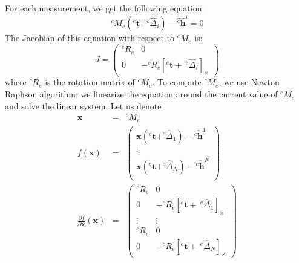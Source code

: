 \documentclass {article}
\newcommand\transf[2]{^{#1}M_{#2}}
\newcommand\linvel{\mathbf{v}}
\newcommand\angvel{\omega}
\newcommand\cross[1]{\left[#1\right]_{\times}}
\newcommand\x{\mathbf{x}}
\newcommand\hole{\mathbf{h}}
\newcommand\tool{\mathbf{t}}
\begin{document}
For each measurement, we get the following equation:
$$
\transf{c}{e}(^e\tool + ^{e}\hat{\Delta}_i) - \hat{^{c}\hole}^i = 0
$$
The Jacobian of this equation with respect to $\transf{c}{e}$ is:
$$
J = \left(\begin{array}{cc} ^{c}R_{e} & 0 \\ 0 & -^{c}R_{e}\cross{^e\tool +\ ^{e}\hat{\Delta}_i}\end{array}\right)
$$
where $^{c}R_{e}$ is the rotation matrix of $\transf{c}{e}$.
To compute $\transf{c}{e}$, we use Newton Raphson algorithm: we linearize the
equation around the current value of $\transf{c}{e}$ and solve the linear
system. Let us denote
\begin{eqnarray*}
  \x &=& \transf{c}{e} \\
  f(\x) &=& \left(\begin{array}{c}
    \x(^e\tool + ^{e}\hat{\Delta}_1) - \hat{^{c}\hole}^1\\
    \vdots\\
    \x(^e\tool + ^{e}\hat{\Delta}_N) - \hat{^{c}\hole}^N\\
    \end{array}\right) \\
    \frac{\partial f}{\partial \x}(\x) &=&
    \left(\begin{array}{cc}
      ^{c}R_{e} & 0 \\
      0 & -^{c}R_{e}\cross{^e\tool +\ ^{e}\hat{\Delta}_1}\\
      \vdots & \vdots \\
      ^{c}R_{e} & 0 \\
      0 & -^{c}R_{e}\cross{^e\tool +\ ^{e}\hat{\Delta}_N}
    \end{array}\right)
\end{eqnarray*}
\end{document}
